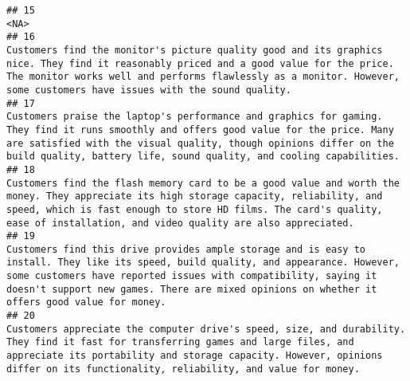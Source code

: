 \documentclass[
]{article}
\begin{document}
\begin{verbatim}
## 15                                                                                                                                                                                                                                                                                                                                                                                                                                                                                   <NA>
## 16                                                                                                                                                                                                                       Customers find the monitor's picture quality good and its graphics nice. They find it reasonably priced and a good value for the price. The monitor works well and performs flawlessly as a monitor. However, some customers have issues with the sound quality.
## 17                                                                                                                                                                                                     Customers praise the laptop's performance and graphics for gaming. They find it runs smoothly and offers good value for the price. Many are satisfied with the visual quality, though opinions differ on the build quality, battery life, sound quality, and cooling capabilities.
## 18                                                                                                                                                                                                              Customers find the flash memory card to be a good value and worth the money. They appreciate its high storage capacity, reliability, and speed, which is fast enough to store HD films. The card's quality, ease of installation, and video quality are also appreciated.
## 19                                                                                                                                                                                 Customers find this drive provides ample storage and is easy to install. They like its speed, build quality, and appearance. However, some customers have reported issues with compatibility, saying it doesn't support new games. There are mixed opinions on whether it offers good value for money.
## 20                                                                                                                                                                                                                 Customers appreciate the computer drive's speed, size, and durability. They find it fast for transferring games and large files, and appreciate its portability and storage capacity. However, opinions differ on its functionality, reliability, and value for money.

\end{verbatim}
\end{document}
